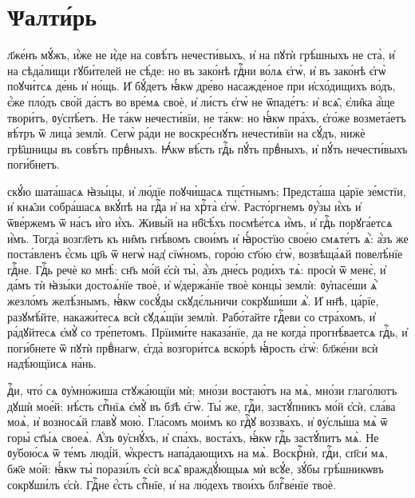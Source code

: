 \part{Ѱалти́рь}



л҃же́нъ мꙋ́жъ, и҆́же не и҆́де на совѣ́тъ нечести́выхъ, и҆ на пꙋтѝ грѣ́шныхъ не ста̀, и҆ на сѣда́лищи гꙋби́телей не сѣ́де:
но въ зако́нѣ гдⷭ҇ни во́лѧ є҆гѡ̀, и҆ въ зако́нѣ є҆гѡ̀ поꙋчи́тсѧ де́нь и҆ но́щь.
И҆ бꙋ́детъ ꙗ҆́кѡ дре́во насажде́ное при и҆схо́дищихъ во́дъ, є҆́же пло́дъ сво́й да́стъ во вре́мѧ своѐ, и҆ ли́стъ є҆гѡ̀ не ѿпаде́тъ: и҆ всѧ̑, є҆ли̑ка а҆́ще твори́тъ, ᲂу҆спѣ́етъ.
Не та́кѡ нечести́вїи, не та́кѡ: но ꙗ҆́кѡ пра́хъ, є҆го́же возмета́етъ вѣ́тръ ѿ лица̀ землѝ.
Сегѡ̀ ра́ди не воскре́снꙋтъ нечести́вїи на сꙋ́дъ, нижѐ грѣ̑шницы въ совѣ́тъ првⷣныхъ.
Ꙗ҆́кѡ вѣ́сть гдⷭ҇ь пꙋ́ть првⷣныхъ, и҆ пꙋ́ть нечести́выхъ поги́бнетъ.


\vskip8pt
скꙋ́ю шата́шасѧ ꙗ҆зы́цы, и҆ лю́дїе поꙋчи́шасѧ тщє́тнымъ;
Предста́ша ца́рїе зе́мстїи, и҆ кнѧ̑зи собра́шасѧ вкꙋ́пѣ на гдⷭ҇а и҆ на хрⷭ҇та̀ є҆гѡ̀.
Расто́ргнемъ ᲂу҆́зы и҆́хъ и҆ ѿве́ржемъ ѿ на́съ и҆́го и҆́хъ.
Живы́й на нб҃сѣ́хъ посмѣе́тсѧ и҆̀мъ, и҆ гдⷭ҇ь порꙋга́етсѧ и҆̀мъ.
Тогда̀ возгл҃етъ къ ни̑мъ гнѣ́вомъ свои́мъ и҆ ꙗ҆́ростїю свое́ю смѧте́тъ ѧ҆̀:
а҆́зъ же поста́вленъ є҆́смь цр҃ь ѿ негѡ̀ над̾ сїѡ́номъ, горо́ю ст҃о́ю є҆гѡ̀,
возвѣща́ѧй повелѣ́нїе гдⷭ҇не. Гдⷭ҇ь речѐ ко мнѣ̀: сн҃ъ мо́й є҆сѝ ты̀, а҆́зъ дне́сь роди́хъ тѧ̀:
просѝ ѿ менє̀, и҆ да́мъ тѝ ꙗ҆зы́ки достоѧ́нїе твоѐ, и҆ ѡ҆держа́нїе твоѐ концы̀ землѝ:
ᲂу҆пасе́ши ѧ҆̀ жезло́мъ желѣ́знымъ, ꙗ҆́кѡ сосꙋ́ды скꙋдє́льничи сокрꙋши́ши ѧ҆̀.
И҆ нн҃ѣ, ца́рїе, разꙋмѣ́йте, накажи́тесѧ всѝ сꙋдѧ́щїи землѝ.
Рабо́тайте гдⷭ҇еви со стра́хомъ, и҆ ра́дꙋйтесѧ є҆мꙋ̀ со тре́петомъ.
Прїими́те наказа́нїе, да не когда̀ прогнѣ́ваетсѧ гдⷭ҇ь, и҆ поги́бнете ѿ пꙋтѝ првⷣнагѡ, є҆гда̀ возгори́тсѧ вско́рѣ ꙗ҆́рость є҆гѡ̀: бл҃же́ни всѝ надѣ́ющїисѧ на́нь.


\clearpage
{}
%
дⷭ҇и, что́ сѧ ᲂу҆мно́жиша стꙋжа́ющїи мѝ; мно́зи востаю́тъ на мѧ̀,
мно́зи глаго́лютъ дꙋшѝ мое́й: нѣ́сть спⷭ҇нїѧ є҆мꙋ̀ въ бз҃ѣ є҆гѡ̀.
Ты́ же, гдⷭ҇и, застꙋ́пникъ мо́й є҆сѝ, сла́ва моѧ̀, и҆ возносѧ́й главꙋ̀ мою̀.
Гла́сомъ мои́мъ ко гдⷭ҇ꙋ воззва́хъ, и҆ ᲂу҆слы́ша мѧ̀ ѿ горы̀ ст҃ы́ѧ своеѧ̀.
А҆́зъ ᲂу҆снꙋ́хъ, и҆ спа́хъ, воста́хъ, ꙗ҆́кѡ гдⷭ҇ь застꙋ́питъ мѧ̀.
Не ᲂу҆бою́сѧ ѿ те́мъ люді́й, ѡ҆́крестъ напа́дающихъ на мѧ̀.
Воскрⷭ҇нѝ, гдⷭ҇и, сп҃си́ мѧ, бж҃е мо́й: ꙗ҆́кѡ ты̀ порази́лъ є҆сѝ всѧ̑ враждꙋ́ющыѧ мѝ всꙋ́е, зꙋ́бы грѣ́шникѡвъ сокрꙋши́лъ є҆сѝ.
Гдⷭ҇не є҆́сть спⷭ҇нїе, и҆ на лю́дехъ твои́хъ блгⷭ҇ве́нїе твоѐ.

